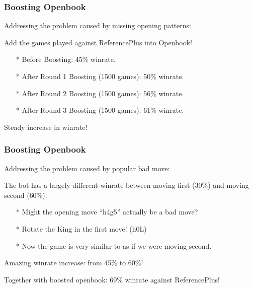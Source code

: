 \documentclass[10pt]{beamer}
\begin{document}
	\begin{frame}
		\frametitle{Boosting Openbook}

		Addressing the problem caused by missing opening patterns:

		\textcolor{fgreen}{Add the games played against ReferencePlus into Openbook!}

		\begin{itemize}
		\item[*] Before Boosting: \textcolor{dred}{45\%} winrate.
		\item[*] After Round 1 Boosting (1500 games): \textcolor{fgreen}{50\%} winrate.
		\item[*] After Round 2 Boosting (1500 games): \textcolor{fgreen}{56\%} winrate.
		\item[*] After Round 3 Boosting (1500 games): \textcolor{fgreen}{61\%} winrate.
		\end{itemize}

		Steady increase in winrate!
	\end{frame}

	\begin{frame}
		\frametitle{Boosting Openbook}

		Addressing the problem caused by popular bad move:

		The bot has a largely different winrate between moving first (\textcolor{dred}{30\%}) and moving second (\textcolor{fgreen}{60\%}).

		\begin{itemize}
		\item[*] Might the opening move ``h4g5'' actually be a bad move?
		\item[*] Rotate the King in the first move! (h0L)
		\item[*] Now the game is very similar to as if we were moving second.
		\end{itemize}

		Amazing winrate increase: from \textcolor{dred}{45\%} to \textcolor{fgreen}{60\%}!

		Together with boosted openbook: \textcolor{fgreen}{69\%} winrate against ReferencePlus!
	\end{frame}
\end{document}
